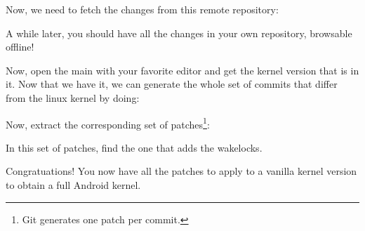Now, we need to fetch the changes from this remote repository:


A while later, you should have all the changes in your own repository, browsable
offline!

Now, open the main  with your favorite editor and get the kernel version
that is in it. Now that we have it, we can generate the whole set of commits that
differ from the linux kernel by doing:


Now, extract the corresponding set of patches\footnote{Git generates one patch per commit.}:


In this set of patches, find the one that adds the wakelocks.

Congratuations! You now have all the patches to apply to a vanilla kernel version to obtain a
full Android kernel.
